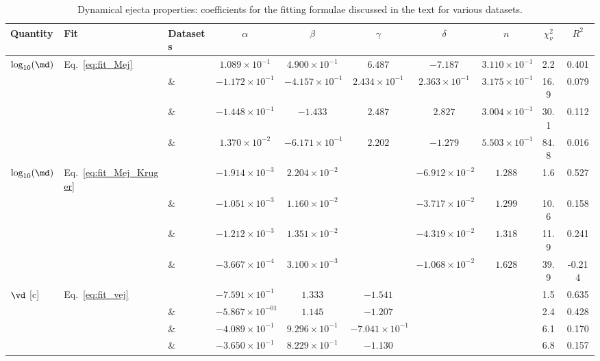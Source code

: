 \begin{table*}
    \caption{
        \label{tab:dynfit:fit_form}
        Dynamical ejecta properties:
        coefficients for the fitting formulae discussed in the text for various datasets.}
    \begin{tabular}{l|l|l|ccccccc}
        \hline\hline
        Quantity&Fit & Datasets & $\alpha$ & $\beta$ & $\gamma$ & $\delta$ & $n$ &  $\chi^2 _{\nu}$ & $R^2$ \\
        \hline
        $\log_{10}(\md)$ & Eq.~\eqref{eq:fit_Mej}  & \DSrefset{} & $1.089\times10^{-1}$ & $4.900\times10^{-1}$ & $6.487$ & $-7.187$ & $3.110\times10^{-1}$ & 2.2 & 0.401 \\ 
        &      & \& \DSheatcool{} & $-1.172\times10^{-1}$ & $-4.157\times10^{-1}$ & $2.434\times10^{-1}$ & $2.363\times10^{-1}$ & $3.175\times10^{-1}$ & 16.9 & 0.079 \\ 
        &      & \& \DScool{} & $-1.448\times10^{-1}$ & $-1.433$ & $2.487$ & $2.827$ & $3.004\times10^{-1}$ & 30.1 & 0.112 \\ 
        &      & \& \DSnone{} & $1.370\times10^{-2}$ & $-6.171\times10^{-1}$ & $2.202$ & $-1.279$ & $5.503\times10^{-1}$ & 84.8 & 0.016 \\ 
        \hline
        $\log_{10}(\md)$ & Eq.~\eqref{eq:fit_Mej_Kruger}  & \DSrefset{} & $-1.914\times10^{-3}$ & $2.204\times10^{-2}$ & & $-6.912\times10^{-2}$ & $1.288$ & 1.6 & 0.527 \\ 
        &      & \& \DSheatcool{} & $-1.051\times10^{-3}$ & $1.160\times10^{-2}$ & & $-3.717\times10^{-2}$ & $1.299$ & 10.6 & 0.158 \\ 
        &      & \& \DScool{} & $-1.212\times10^{-3}$ & $1.351\times10^{-2}$ & & $-4.319\times10^{-2}$ & $1.318$ & 11.9 & 0.241 \\ 
        &      & \& \DSnone{} & $-3.667\times10^{-4}$ & $3.100\times10^{-3}$ & & $-1.068\times10^{-2}$ & $1.628$ & 39.9 & -0.214 \\ 
        \hline
        $\vd$ [c] & Eq.~\eqref{eq:fit_vej}& \DSrefset{} & $-7.591\times10^{-1}$ & $1.333$ & $-1.541$ & & & 1.5 & 0.635 \\ 
        &      & \& \DSheatcool{} & $-5.867\times10^{-01}$ & $1.145$ & $-1.207$ & & & 2.4 & 0.428 \\ 
        &      & \& \DScool{} & $-4.089\times10^{-1}$ & $9.296\times10^{-1}$ & $-7.041\times10^{-1}$ & & & 6.1 & 0.170 \\ 
        &      & \& \DSnone{} & $-3.650\times10^{-1}$ & $8.229\times10^{-1}$ & $-1.130$ & & & 6.8 & 0.157 \\ 
        \hline\hline
    \end{tabular}
\end{table*}

